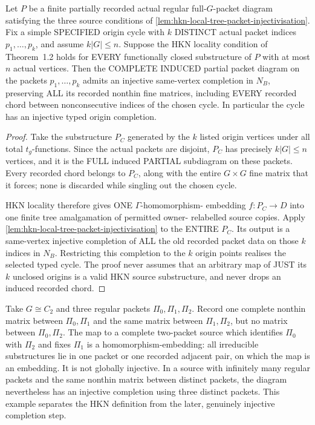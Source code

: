 \begin{lemma}
\label{lem:hkn-chord-complete-short-cycle}
Let \(P\) be a finite
partially recorded actual
regular full-\(G\)-packet
diagram satisfying the
three source conditions
of
\cref{lem:hkn-local-tree-packet-injectivisation}.
Fix a simple SPECIFIED
origin cycle with \(k\)
DISTINCT actual packet
indices
\(p_1,\ldots,p_k\),
and assume \(k|G|\le n\).
Suppose the HKN locality
condition of Theorem~1.2
holds for EVERY
functionally closed
substructure of \(P\)
with at most \(n\)
actual vertices.
Then the COMPLETE
INDUCED partial packet
diagram on the packets
\(p_1,\ldots,p_k\)
admits an injective
same-vertex completion
in \(N_B\), preserving
ALL its recorded
nonthin fine matrices,
including EVERY recorded
chord between
nonconsecutive indices
of the chosen cycle.
In particular the
cycle has an injective
typed origin completion.
\end{lemma}
\begin{proof}
Take the substructure
\(P_C\) generated by the
\(k\) listed origin
vertices under all
total \(t_g\)-functions.
Since the actual
packets are disjoint,
\(P_C\) has precisely
\(k|G|\le n\)
vertices, and it is
the FULL induced
PARTIAL subdiagram on
these packets. Every
recorded chord belongs
to \(P_C\), along with
the entire
\(G\times G\) fine
matrix that it forces;
none is discarded
while singling out
the chosen cycle.

HKN locality therefore
gives ONE
\(\Gamma\)-homomorphism-
embedding
\(f:P_C\to D\) into
one finite tree
amalgamation of
permitted owner-
relabelled source
copies. Apply
\cref{lem:hkn-local-tree-packet-injectivisation}
to the ENTIRE \(P_C\).
Its output is
a same-vertex
injective completion
of ALL the old
recorded packet data
on those \(k\)
indices in \(N_B\).
Restricting this
completion to the
\(k\) origin points
realises the selected
typed cycle.
The proof never assumes
that an arbitrary map
of JUST its \(k\)
unclosed origins is a
valid HKN source
substructure, and
never drops an induced
recorded chord.
\end{proof}

\begin{example}
\label{ex:hkn-unrecorded-collapse}
Take $G\cong C_2$ and three regular packets
$\Pi_0,\Pi_1,\Pi_2$.  Record one complete nonthin matrix
between $\Pi_0,\Pi_1$ and the same matrix between
$\Pi_1,\Pi_2$, but no matrix between $\Pi_0,\Pi_2$.
The map to a complete two-packet source which identifies
$\Pi_0$ with $\Pi_2$ and fixes $\Pi_1$ is a
homomorphism-embedding: all irreducible substructures lie in
one packet or one recorded adjacent pair, on which the map is
an embedding.  It is not globally injective.  In a source with
infinitely many regular packets and the same nonthin matrix
between distinct packets, the diagram nevertheless has an
injective completion using three distinct packets.  This example
separates the HKN definition from the later, genuinely injective
completion step.
\end{example}

